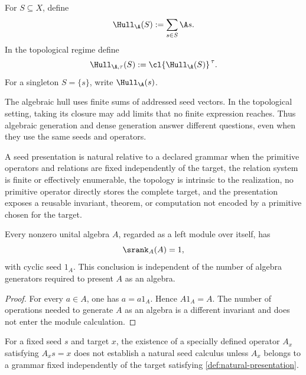 \begin{definition}
\label{def:generated-hull}
For $S\subseteq X$, define
\[
\Hull_{\A}(S):=\sum_{s\in S}\A s.
\]
In the topological regime define
\[
\Hull_{\A,\tau}(S):=\cl{\Hull_{\A}(S)}^{\,\tau}.
\]
For a singleton $S=\{s\}$, write $\Hull_{\A}(s)$.
\end{definition}

The algebraic hull uses finite sums of addressed seed vectors.  In the topological setting, taking its closure may add limits that no finite expression reaches.  Thus algebraic generation and dense generation answer different questions, even when they use the same seeds and operators.

\begin{definition}
\label{def:natural-presentation}
A seed presentation is natural relative to a declared grammar when the primitive operators and relations are fixed independently of the target, the relation system is finite or effectively enumerable, the topology is intrinsic to the realization, no primitive operator directly stores the complete target, and the presentation exposes a reusable invariant, theorem, or computation not encoded by a primitive chosen for the target.
\end{definition}

\begin{proposition}
\label{prop:algebra-module-generation}
Every nonzero unital algebra $A$, regarded as a left module over itself, has
\[
\srank_A(A)=1,
\]
with cyclic seed $1_A$.  This conclusion is independent of the number of algebra generators required to present $A$ as an algebra.
\end{proposition}

\begin{proof}
For every $a\in A$, one has $a=a1_A$.  Hence $A1_A=A$.  The number of operations needed to generate $A$ as an algebra is a different invariant and does not enter the module calculation.
\end{proof}

\begin{boundary}
\label{bnd:target-dependent-operators}
For a fixed seed $s$ and target $x$, the existence of a specially defined operator $A_x$ satisfying $A_xs=x$ does not establish a natural seed calculus unless $A_x$ belongs to a grammar fixed independently of the target satisfying \cref{def:natural-presentation}.
\end{boundary}

